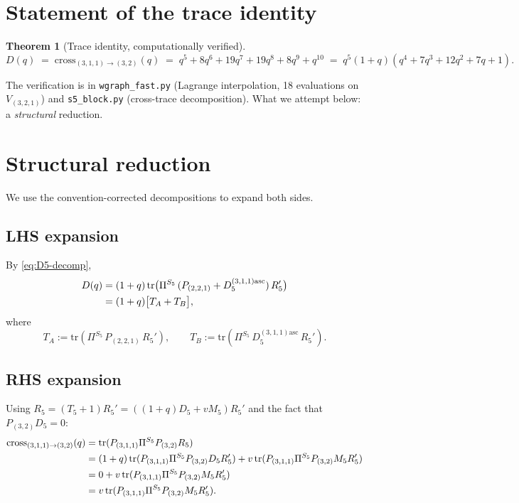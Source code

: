\documentclass[11pt]{article}
\newtheorem{theorem}{Theorem}
\theoremstyle{definition}
\begin{document}
\section{Statement of the trace identity}

\begin{theorem}[Trace identity, computationally verified]\label{thm:main}
\[
D(q) \;=\; \mathrm{cross}_{(3,1,1)\to(3,2)}(q) \;=\; q^5 + 8q^6 + 19q^7 + 19q^8 + 8q^9 + q^{10} \;=\; q^5(1+q)(q^4+7q^3+12q^2+7q+1).
\]
\end{theorem}

\noindent The verification is in \texttt{wgraph\_fast.py} (Lagrange interpolation, 18 evaluations on $V_{(3,2,1)}$) and \texttt{s5\_block.py} (cross-trace decomposition). What we attempt below: a \emph{structural} reduction.

\section{Structural reduction}\label{sec:reduction}

We use the convention-corrected decompositions to expand both sides.

\subsection*{LHS expansion}

By \eqref{eq:D5-decomp},
\begin{align}
D(q) &= (1+q)\,\mathrm{tr}\bigl(\Pi^{S_5}\, (P_{(2,2,1)} + D_5^{(3,1,1)\mathrm{asc}})\, R_5'\bigr) \notag\\
&= (1+q)\bigl[T_A + T_B\bigr], \label{eq:D-decomp}
\end{align}
where
\begin{equation}\label{eq:TA-TB}
T_A := \mathrm{tr}(\Pi^{S_5}\, P_{(2,2,1)}\, R_5'), \qquad T_B := \mathrm{tr}(\Pi^{S_5}\, D_5^{(3,1,1)\mathrm{asc}}\, R_5').
\end{equation}

\subsection*{RHS expansion}

Using $R_5 = (T_5+1) R_5' = ((1+q) D_5 + v M_5) R_5'$ and the fact that $P_{(3,2)} D_5 = 0$:
\begin{align}
\mathrm{cross}_{(3,1,1)\to(3,2)}(q) &= \mathrm{tr}(P_{(3,1,1)} \Pi^{S_5} P_{(3,2)} R_5) \notag\\
&= (1+q)\,\mathrm{tr}(P_{(3,1,1)} \Pi^{S_5} P_{(3,2)} D_5 R_5') + v\,\mathrm{tr}(P_{(3,1,1)} \Pi^{S_5} P_{(3,2)} M_5 R_5') \notag\\
&= 0 + v\,\mathrm{tr}(P_{(3,1,1)} \Pi^{S_5} P_{(3,2)} M_5 R_5') \notag\\
&= v\,\mathrm{tr}(P_{(3,1,1)} \Pi^{S_5} P_{(3,2)} M_5 R_5'). \label{eq:cross-decomp}
\end{align}
\end{document}
